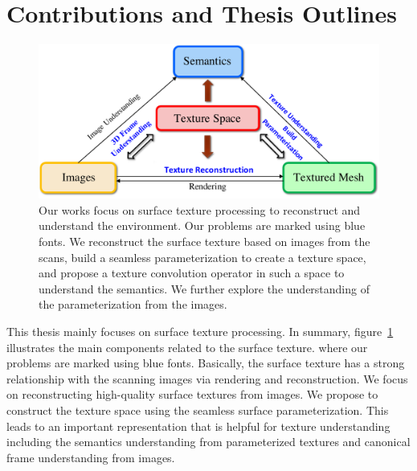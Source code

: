 
\section{Contributions and Thesis Outlines}
\label{intro:contribution}
\begin{figure}
    \centering
    \includegraphics[width=0.75\linewidth]{intro/concept.pdf}
    \caption{Our works focus on surface texture processing to reconstruct and understand the environment. Our problems are marked using blue fonts. We reconstruct the surface texture based on images from the scans, build a seamless parameterization to create a texture space, and propose a texture convolution operator in such a space to understand the semantics. We further explore the understanding of the parameterization from the images.}
    \label{fig:intro-concept}
\end{figure}
This thesis mainly focuses on surface texture processing. In summary, figure~\ref{fig:intro-concept} illustrates the main components related to the surface texture. where our problems are marked using blue fonts. Basically, the surface texture has a strong relationship with the scanning images via rendering and reconstruction. We focus on reconstructing high-quality surface textures from images. We propose to construct the texture space using the seamless surface parameterization. This leads to an important representation that is helpful for texture understanding including the semantics understanding from parameterized textures and canonical frame understanding from images.

